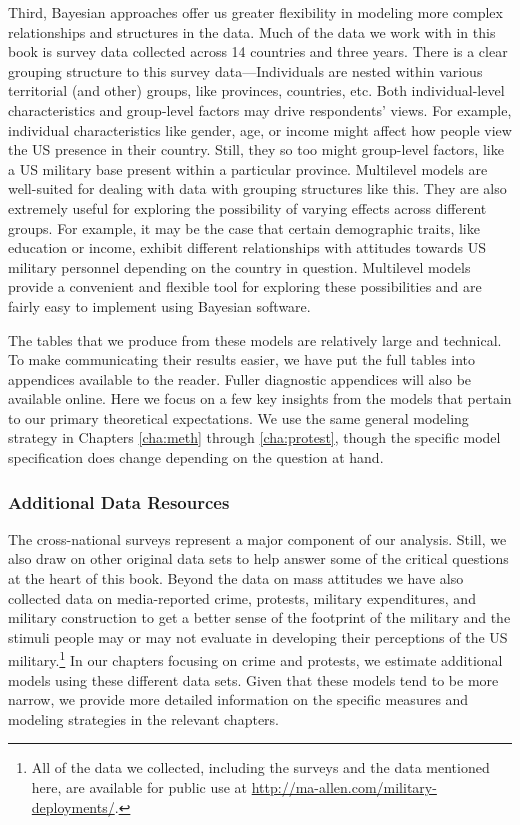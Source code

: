 Third, Bayesian approaches offer us greater flexibility in modeling more complex relationships and structures in the data. Much of the data we work with in this book is survey data collected across 14 countries and three years. There is a clear grouping structure to this survey data---Individuals are nested within various territorial (and other) groups, like provinces, countries, etc. Both individual-level characteristics and group-level factors may drive respondents' views. For example, individual characteristics like gender, age, or income might affect how people view the US presence in their country. Still, they so too might group-level factors, like a US military base present within a particular province. Multilevel models are well-suited for dealing with data with grouping structures like this. They are also extremely useful for exploring the possibility of varying effects across different groups. For example, it may be the case that certain demographic traits, like education or income, exhibit different relationships with attitudes towards US military personnel depending on the country in question. Multilevel models provide a convenient and flexible tool for exploring these possibilities and are fairly easy to implement using Bayesian software. 

The tables that we produce from these models are relatively large and technical. To make communicating their results easier, we have put the full tables into appendices available to the reader. Fuller diagnostic appendices will also be available online. Here we focus on a few key insights from the models that pertain to our primary theoretical expectations. We use the same general modeling strategy in Chapters \ref{cha:meth} through \ref{cha:protest}, though the specific model specification does change depending on the question at hand.


\subsubsection*{Additional Data Resources}

The cross-national surveys represent a major component of our analysis. Still, we also draw on other original data sets to help answer some of the critical questions at the heart of this book. Beyond the data on mass attitudes we have also collected data on media-reported crime, protests, military expenditures, and military construction to get a better sense of the footprint of the military and the stimuli people may or may not evaluate in developing their perceptions of the US military.\footnote{All of the data we collected, including the surveys and the data mentioned here, are available for public use at \url{http://ma-allen.com/military-deployments/}.} In our chapters focusing on crime and protests, we estimate additional models using these different data sets. Given that these models tend to be more narrow, we provide more detailed information on the specific measures and modeling strategies in the relevant chapters.



